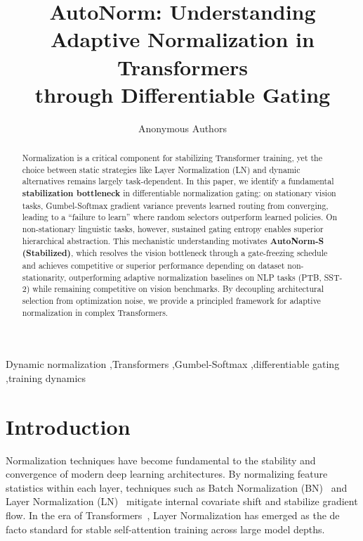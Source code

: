 \documentclass[final,3p,times,twocolumn]{elsarticle}
\begin{document}
\begin{frontmatter}

\title{AutoNorm: Understanding Adaptive Normalization in Transformers\\
      through Differentiable Gating}
\author{Anonymous Authors}

\begin{abstract}
Normalization is a critical component for stabilizing Transformer
training, yet the choice between static strategies like Layer
Normalization (LN) and dynamic alternatives remains largely
task-dependent. In this paper, we identify a fundamental
\textbf{stabilization bottleneck} in differentiable normalization
gating: on stationary vision tasks, Gumbel-Softmax gradient variance
prevents learned routing from converging, leading to a ``failure to
learn'' where random selectors outperform learned policies. On
non-stationary linguistic tasks, however, sustained gating entropy
enables superior hierarchical abstraction. This mechanistic
understanding motivates \textbf{AutoNorm-S (Stabilized)}, which
resolves the vision bottleneck through a gate-freezing schedule and
achieves competitive or superior performance depending on dataset
non-stationarity, outperforming adaptive normalization baselines on
NLP tasks (PTB, SST-2) while remaining competitive on vision benchmarks. By decoupling architectural selection from optimization
noise, we provide a principled framework for adaptive normalization in
complex Transformers.
\end{abstract}

\begin{keyword}
Dynamic normalization \sep Transformers \sep Gumbel-Softmax \sep differentiable gating \sep training dynamics
\end{keyword}

\end{frontmatter}

\section{Introduction}

Normalization techniques have become fundamental to the stability
and convergence of modern deep learning architectures. By normalizing
feature statistics within each layer, techniques such as Batch
Normalization (BN)~\cite{ioffe2015batch} and Layer Normalization
(LN)~\cite{ba2016layernorm} mitigate internal covariate shift and
stabilize gradient flow. In the era of Transformers~\cite{vaswani2017attention},
Layer Normalization has emerged as the de facto standard for stable
self-attention training across large model depths.
\end{document}
